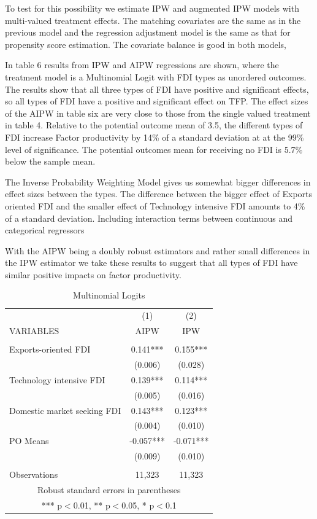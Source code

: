 \documentclass[a4paper,11pt]{scrartcl}
\begin{document}
To test for this possibility we estimate IPW and augmented IPW models with multi-valued treatment effects. The matching covariates are the same as in the previous model and the regression adjustment model is the same as that for propensity score estimation. The covariate balance is good in both models, 


In table 6 results from IPW and AIPW regressions are shown, where the treatment model is a Multinomial Logit with FDI types as unordered outcomes. The results show that all three types of FDI have positive and significant effects, so all types of FDI have a positive and significant effect on TFP. The effect sizes of the AIPW in table six are very close to those from the single valued treatment in table 4. Relative to the potential outcome mean of 3.5, the different types of FDI increase Factor productivity by 14\% of a standard deviation at at the 99\% level of significance.	The potential outcomes mean for receiving no FDI is 5.7\% below the sample mean. 

The Inverse Probability Weighting Model gives us somewhat bigger differences in effect sizes between the types. The difference between the bigger effect of Exports oriented FDI and the smaller effect of Technology intensive FDI amounts to 4\% of a standard deviation. Including interaction terms between continuous and categorical regressors 

With the AIPW being a doubly robust estimators and rather small differences in the IPW estimator we take these results to suggest that all types of FDI have similar positive impacts on factor productivity. 


\begin{table}[htbp]\centering
\caption{Multinomial Logits}
\begin{tabular}{lcc} \hline
 & (1) & (2)  \\
VARIABLES & AIPW & IPW \\ \hline
 &  &      \\
Exports-oriented FDI & 0.141***&   0.155***   \\
 & (0.006)   & (0.028)  \\
Technology intensive FDI & 0.139*** &   0.114***   \\
 & (0.005)   & (0.016)   \\
Domestic market seeking FDI & 0.143*** &   0.123***  \\
 & (0.004)   & (0.010)   \\
PO Means &  -0.057*** &   -0.071*** \\
 &   (0.009) &   (0.010) \\
 &  &      \\
 Observations & 11,323 & 11,323  \\ \hline
\multicolumn{3}{c}{ Robust standard errors in parentheses} \\
\multicolumn{3}{c}{ *** p$<$0.01, ** p$<$0.05, * p$<$0.1} \\
\end{tabular}
\end{table}
\end{document}
